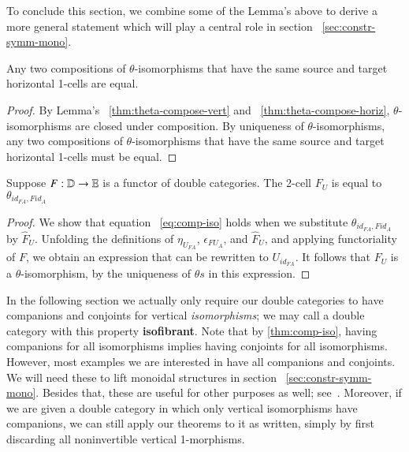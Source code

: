 \documentclass{amsart}
\begin{document}
To conclude this section, we combine some of the Lemma's above to derive a more general statement which will play a central role in section ~\ref{sec:constr-symm-mono}.

\begin{lem}\label{lem:equal}
Any two compositions of $\theta$-isomorphisms that have the same source and target horizontal 1-cells are equal.
\end{lem}

\begin{proof}
By Lemma's ~\ref{thm:theta-compose-vert} and ~\ref{thm:theta-compose-horiz}, $\theta$-isomorphisms are closed under composition. By uniqueness of $\theta$-isomorphisms, any two compositions of $\theta$-isomorphisms that have the same source and target horizontal 1-cells must be equal.
\end{proof}

\begin{lem}\label{lem:FUtheta}
Suppose $F:\mathbb{D} \rightarrow \mathbb{E}$ is a functor of double categories. The 2-cell $F_U$ is equal to $\theta_{id_{FA}, Fid_A}$
\end{lem}

\begin{proof}
We show that equation ~\ref{eq:comp-iso} holds when we substitute $\theta_{id_{FA}, Fid_A}$ by $\hat{F}_U$.  Unfolding the definitions of $\eta_{U_{FA}}$, $\epsilon_{FU_A}$, and $\hat{F}_U$, and applying functoriality of $F$, we obtain an expression that can be rewritten to $U_{id_{FA}}$. It follows that $F_U$ is a $\theta$-isomorphism, by the uniqueness of $\theta s$ in this expression.
\end{proof}


\begin{rmk}
  In the following section we actually only require our double
  categories to have companions and conjoints for vertical
  \emph{isomorphisms}; we may call a double category with this
  property \textbf{isofibrant}.  Note that by \autoref{thm:comp-iso},
  having companions for all isomorphisms implies having conjoints for
  all isomorphisms.  However, most examples we are interested in have
  all companions and conjoints. We will need these to lift monoidal structures in section ~\ref{sec:constr-symm-mono}. Besides that, these are useful for other
  purposes as well; see~\cite{shulman:frbi}.  Moreover, if we are
  given a double category in which only vertical isomorphisms have
  companions, we can still apply our theorems to it as written, simply
  by first discarding all noninvertible vertical 1-morphisms.
\end{rmk}
\end{document}
